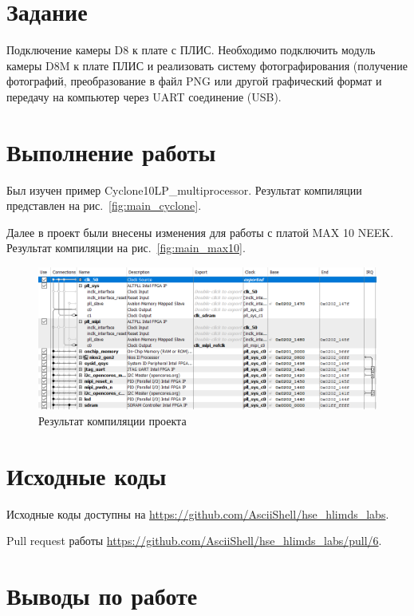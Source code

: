 \documentclass[a4paper,14pt]{article}
\begin{document}
    
    \tableofcontents
    \pagebreak


    \section{Задание}

Подключение камеры D8 к плате с ПЛИС. 
Необходимо подключить модуль камеры D8M к плате ПЛИС и реализовать систему фотографирования (получение фотографий, преобразование в файл PNG или другой графический формат и передачу на компьютер через UART соединение (USB).


    \section{Выполнение работы}

	Был изучен пример Cyclone10LP\_multiprocessor.
	Результат компиляции представлен на рис.~\ref{fig:main_cyclone}.
	
	Далее в проект были внесены изменения для работы с платой MAX 10 NEEK.
	Результат компиляции на рис.~\ref{fig:main_max10}.
	
    \begin{figure}[H]
		\centering
		\includegraphics[width=\linewidth]{images/nios}
		\caption{Результат компиляции проекта}
		\label{fig:nios}
	\end{figure}


    \section{Исходные коды}

    Исходные коды доступны на \href{https://github.com/AsciiShell/hse_hlimds_labs}
    {https://github.com/AsciiShell/hse\_hlimds\_labs}.

    Pull request работы \href{https://github.com/AsciiShell/hse_hlimds_labs/pull/6}
    {https://github.com/AsciiShell/hse\_hlimds\_labs/pull/6}.


    \section{Выводы по работе}

\end{document}
